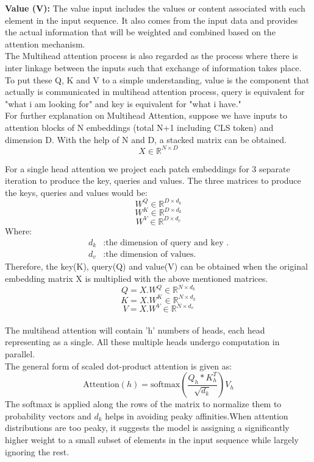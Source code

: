 \textbf{Value (V):} The value input includes the values or content associated with each element in the input sequence. It also comes from the input data and provides the actual information that will be weighted and combined based on the attention mechanism.\\

The Multihead attention process is also regarded as the process where there is inter linkage between the inputs such that exchange of information takes place. To put these Q, K and V to a simple understanding, value is the component that actually is communicated in multihead attention process, query is equivalent for "what i am looking for" and key is equivalent for "what i have."\\

For further explanation  on Multihead Attention, suppose we have inputs to attention blocks of N embeddings (total N+1 including CLS token) and dimension D. With the help of N and D, a stacked matrix can be obtained.
\[ X \in \mathbb{R}^{N \times D}\] 

For a single head attention we project each patch embeddings for 3 separate iteration to produce the key, queries and values. The three matrices to produce the keys, queries and values would be:
\[ W^Q \in \mathbb{R}^{D\times d_k}\] 
\[ W^K \in \mathbb{R}^{D \times d_k}\] 
\[ W^V \in \mathbb{R}^{D \times d_v}\] 
Where:
\begin{align*}
    d_k & : \text{the dimension of query and key .} \\
    d_v & : \text{the dimension of values.}
\end{align*}
Therefore, the key(K), query(Q) and value(V) can be obtained when the original embedding matrix X is multiplied with the above mentioned matrices.
\[Q = X.W^Q \in \mathbb{R}^{N\times d_k}\] 
\[K = X.W^K \in \mathbb{R}^{N\times d_k}\] 
\[V = X.W^V \in \mathbb{R}^{N\times d_v}\] \\

The multihead attention will contain 'h' numbers of heads, each head representing as a single. All these multiple heads undergo computation in parallel. \\

The general form of  scaled dot-product attention is given as:
\[\text{Attention}(h) = \text{softmax}\left(\frac{Q_h * K_h ^T}{\sqrt{d_k}}\right) V_h\]
The softmax is applied along the rows of the matrix to normalize them to probability vectors and $d_k$ helps in avoiding peaky affinities.When attention distributions are too peaky, it suggests the model is assigning a significantly higher weight to a small subset of elements in the input sequence while largely ignoring the rest.\\

